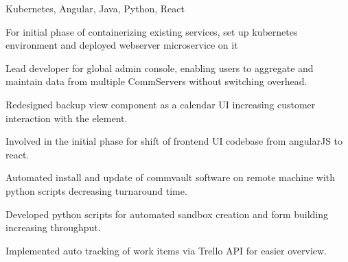 \documentclass[]{font}
\begin{document}
\begin{minipage}[t]{0.66\textwidth}
Kubernetes, Angular, Java, Python, React
\vspace{\topsep}
\begin{tightemize}
\item For initial phase of containerizing existing services, set up kubernetes environment and deployed webserver microservice on it  
\item Lead developer for global admin console, enabling users to aggregate and maintain data from multiple CommServers without switching overhead. 
\item Redesigned backup view component as a calendar UI increasing customer interaction with the element.
\item Involved in the initial phase for shift of frontend UI codebase from angularJS to react.
\item Automated install and update of commvault software on remote machine with python scripts decreasing turnaround time.
\item Developed python scripts for automated sandbox creation and form building increasing throughput. 
\item Implemented auto tracking of work items via Trello API for easier overview.
\end{tightemize}    
\sectionsep



\end{minipage}
\end{document}

